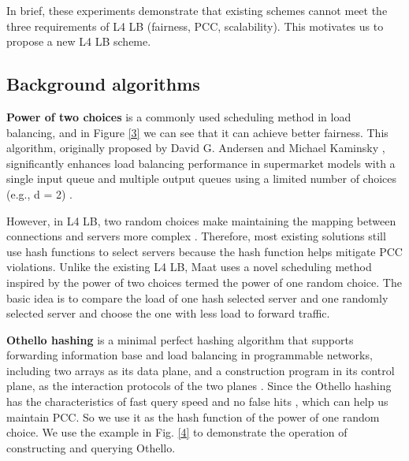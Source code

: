 In brief, these experiments demonstrate that existing schemes cannot meet the three requirements of L4 LB (fairness, PCC, scalability). This motivates us to propose a new L4 LB scheme.


\subsection{Background algorithms}
\textbf{Power of two choices} is a commonly used scheduling method in load balancing, and in Figure \ref{3} we can see that it can achieve better fairness. This algorithm, originally proposed by David G. Andersen and Michael Kaminsky \cite{mitzenmacher2001power}, significantly enhances load balancing performance in supermarket models with a single input queue and multiple output queues using a limited number of choices (e.g., d = 2) \cite{ghorbani2017drill}.

However, in L4 LB, two random choices make maintaining the mapping between connections and servers more complex \cite{zhang2021loom, barbette2020high}. Therefore, most existing solutions still use hash functions to select servers because the hash function helps mitigate PCC violations. Unlike the existing L4 LB, Maat uses a novel scheduling method inspired by the power of two choices termed the power of one random choice. The basic idea is to compare the load of one hash selected server and one randomly selected server and choose the one with less load to forward traffic. 


\textbf{Othello hashing} is a minimal perfect hashing algorithm \cite{yu2017othello, chazelle2004bloomier} that supports forwarding information base and load balancing in programmable networks, including two arrays as its data plane, and a construction program in its control plane, as the interaction protocols of the two planes \cite{shi2020concury}. Since the Othello hashing has the characteristics of fast query speed and no false hits \cite{yu2017sdlb}, which can help us maintain PCC. So we use it as the hash function of the power of one random choice. We use the example in Fig. \ref{4} to demonstrate the operation of constructing and querying Othello.


